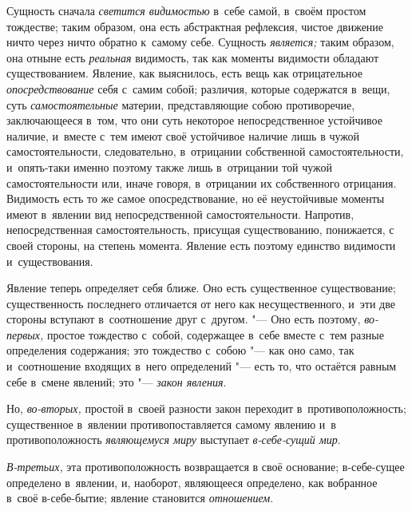 Сущность сначала {\em светится видимостью} в~себе самой,
в~своём простом тождестве; таким образом, она есть абстрактная рефлексия,
чистое движение ничто через ничто обратно к~самому себе. Сущность
{\em является;} таким образом, она отныне есть
{\em реальная} видимость, так как моменты видимости
обладают существованием. Явление, как выяснилось, есть вещь как
отрицательное {\em опосредствование} себя с~самим
собой; различия, которые содержатся в~вещи, суть
{\em самостоятельные} материи, представляющие собою
противоречие, заключающееся в~том, что они суть некоторое непосредственное
устойчивое наличие, и~вместе с~тем имеют своё устойчивое наличие лишь в
чужой самостоятельности, следовательно, в~отрицании собственной
самостоятельности, и~опять-таки именно поэтому также лишь в~отрицании той
чужой самостоятельности или, иначе говоря, в~отрицании их собственного
отрицания. Видимость есть то же самое опосредствование, но её неустойчивые
моменты имеют в~явлении вид непосредственной самостоятельности. Напротив,
непосредственная самостоятельность, присущая существованию, понижается, с
своей стороны, на степень момента. Явление есть поэтому единство видимости
и~существования.

Явление теперь определяет себя ближе. Оно есть существенное существование;
существенность последнего отличается от него как несущественного, и~эти две
стороны вступают в~соотношение друг с~другом. "--- Оно есть поэтому,
{\em во-первых,} простое тождество с~собой, содержащее
в~себе вместе с~тем разные определения содержания; это тождество с~собою
"--- как оно само, так и~соотношение входящих в~него определений "--- есть то,
что остаётся равным себе в~смене явлений; это
"--- {\em закон явления}.

Но, {\em во-вторых,} простой в~своей разности закон
переходит в~противоположность; существенное в~явлении противопоставляется
самому явлению и~в противоположность {\em являющемуся
миру} выступает {\em в-себе-сущий мир}.

{\em В-третьих,} эта противоположность возвращается в
своё основание; в-себе-сущее определено в~явлении, и, наоборот, являющееся
определено, как вобранное в~своё в-себе-бытие; явление становится
{\em отношением}.

